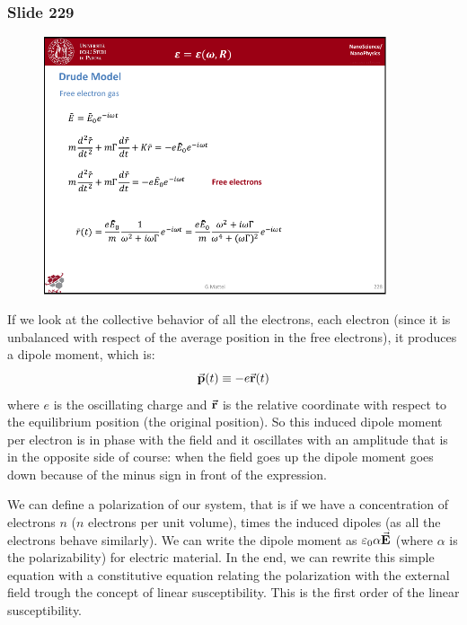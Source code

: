 \documentclass[../main/main.tex]{subfiles}
\begin{document}
\newpage
\subsubsection{Slide 229}

\begin{figure}[h!]
\centering
\includegraphics[page=2,width=0.9\textwidth]{../lessons/pdf_file/15_lesson.pdf}
\end{figure}

If we look at the collective behavior of all the electrons, each electron (since it is unbalanced with respect of the average position in the free electrons), it produces a dipole moment, which is:
\begin{equation*}
  \va{p} (t) \equiv - e \va{r} (t)
\end{equation*}
where \( e \) is the oscillating charge and \( \va{r} \) is the relative coordinate with respect to the equilibrium position (the original position).
So this induced dipole moment per electron is in phase with the field and it oscillates with an amplitude that is in the opposite side of course: when the field goes up the dipole moment goes down because of the minus sign in front of the expression.

We can define a polarization of our system, that is if we have a concentration of electrons \( n \) (\( n \) electrons per unit volume), times the induced dipoles (as all the electrons behave similarly). We can write the dipole moment as \( \varepsilon _0 \alpha \va{E} \) (where \( \alpha  \) is the polarizability) for electric material. In the end, we can rewrite this simple equation with a constitutive equation relating the polarization with the external field trough the concept of linear susceptibility. This is the first order of the linear susceptibility.
\end{document}
